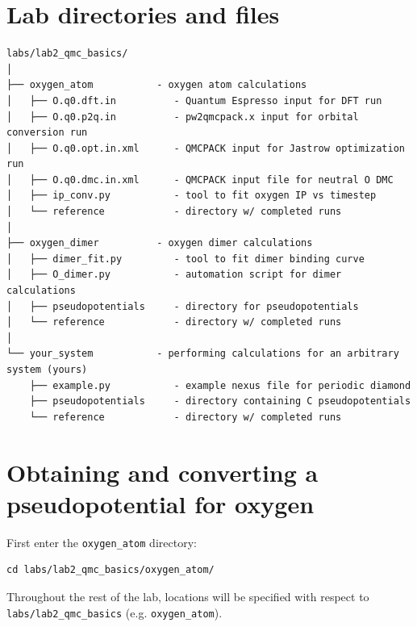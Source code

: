 \section{Lab directories and files}

\begin{shaded}
\begin{verbatim}
labs/lab2_qmc_basics/
│
├── oxygen_atom           - oxygen atom calculations 
│   ├── O.q0.dft.in          - Quantum Espresso input for DFT run
│   ├── O.q0.p2q.in          - pw2qmcpack.x input for orbital conversion run
│   ├── O.q0.opt.in.xml      - QMCPACK input for Jastrow optimization run
│   ├── O.q0.dmc.in.xml      - QMCPACK input file for neutral O DMC
│   ├── ip_conv.py           - tool to fit oxygen IP vs timestep
│   └── reference            - directory w/ completed runs
│
├── oxygen_dimer          - oxygen dimer calculations
│   ├── dimer_fit.py         - tool to fit dimer binding curve
│   ├── O_dimer.py           - automation script for dimer calculations
│   ├── pseudopotentials     - directory for pseudopotentials
│   └── reference            - directory w/ completed runs
│
└── your_system           - performing calculations for an arbitrary system (yours)
    ├── example.py           - example nexus file for periodic diamond
    ├── pseudopotentials     - directory containing C pseudopotentials
    └── reference            - directory w/ completed runs

\end{verbatim}
\end{shaded}





\section{Obtaining and converting a pseudopotential for oxygen}
\label{sec:lqb_pseudo}
First enter the \texttt{oxygen\_atom} directory:
\begin{shaded}
\begin{verbatim}
cd labs/lab2_qmc_basics/oxygen_atom/
\end{verbatim}
\end{shaded}
\noindent
Throughout the rest of the lab, locations will be specified with respect to \texttt{labs/lab2\_qmc\_basics} (e.g. \texttt{oxygen\_atom}).

